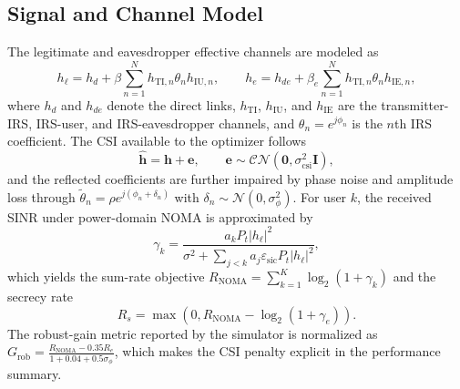 \subsection{Signal and Channel Model}
The legitimate and eavesdropper effective channels are modeled as
\begin{equation}
h_{\ell} = h_{d} + \beta \sum_{n=1}^{N} h_{\mathrm{TI},n} \theta_n h_{\mathrm{IU},n}, \qquad h_{e} = h_{de} + \beta_e \sum_{n=1}^{N} h_{\mathrm{TI},n} \theta_n h_{\mathrm{IE},n},
\label{eq:effective_channels}
\end{equation}
where $h_d$ and $h_{de}$ denote the direct links, $h_{\mathrm{TI}}$, $h_{\mathrm{IU}}$, and $h_{\mathrm{IE}}$ are the transmitter-IRS, IRS-user, and IRS-eavesdropper channels, and $\theta_n=e^{j\phi_n}$ is the $n$th IRS coefficient.
The CSI available to the optimizer follows
\begin{equation}
\widehat{\mathbf{h}} = \mathbf{h} + \mathbf{e}, \qquad \mathbf{e} \sim \mathcal{CN}(\mathbf{0}, \sigma_{\mathrm{csi}}^{2}\mathbf{I}),
\label{eq:csi_model}
\end{equation}
and the reflected coefficients are further impaired by phase noise and amplitude loss through $\widetilde{\theta}_n = \rho e^{j(\phi_n + \delta_n)}$ with $\delta_n \sim \mathcal{N}(0,\sigma_{\phi}^{2})$.
For user $k$, the received SINR under power-domain NOMA is approximated by
\begin{equation}
\gamma_k = \frac{a_k P_t |h_{\ell}|^2}{\sigma^2 + \sum_{j < k} a_j \varepsilon_{\mathrm{sic}} P_t |h_{\ell}|^2},
\label{eq:noma_sinr}
\end{equation}
which yields the sum-rate objective $R_{\mathrm{NOMA}} = \sum_{k=1}^{K}\log_2(1+\gamma_k)$ and the secrecy rate
\begin{equation}
R_s = \max \left(0, R_{\mathrm{NOMA}} - \log_2(1+\gamma_e)\right).
\label{eq:secrecy_rate}
\end{equation}
The robust-gain metric reported by the simulator is normalized as $G_{\mathrm{rob}} = \frac{R_{\mathrm{NOMA}} - 0.35 R_e}{1 + 0.04 + 0.5\sigma_{\phi}}$, which makes the CSI penalty explicit in the performance summary.
